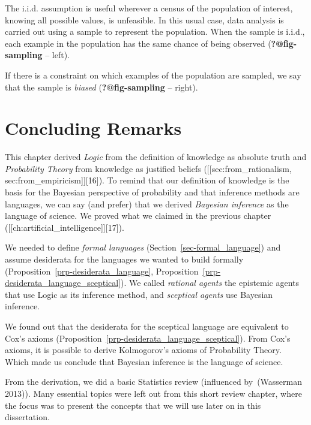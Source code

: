 \documentclass[
  letterpaper,
  12pt,
  british]{tufte-book}
\theoremstyle{plain}
\theoremstyle{plain}
\theoremstyle{definition}
\theoremstyle{remark}
\begin{document}
The i.i.d. assumption is useful wherever a census of the population of
interest, knowing all possible values, is unfeasible. In this usual
case, data analysis is carried out using a sample to represent the
population. When the sample is i.i.d., each example in the population
has the same chance of being observed (\textbf{?@fig-sampling} -- left).

If there is a constraint on which examples of the population are
sampled, we say that the sample is \emph{biased}
(\textbf{?@fig-sampling} -- right).

\hypertarget{concluding-remarks-1}{%
\section{Concluding Remarks}\label{concluding-remarks-1}}

This chapter derived \emph{Logic} from the definition of knowledge as
absolute truth and \emph{Probability Theory} from knowledge as justified
beliefs ({[}{[}sec:from\_rationalism,
sec:from\_empiricism{]}{]}{[}16{]}). To remind that our definition of
knowledge is the basis for the Bayesian perspective of probability and
that inference methods are languages, we can say (and prefer) that we
derived \emph{Bayesian inference} as the language of science. We proved
what we claimed in the previous chapter
({[}{[}ch:artificial\_intelligence{]}{]}{[}17{]}).

We needed to define \emph{formal languages}
(Section~\ref{sec-formal_language}) and assume desiderata for the
languages we wanted to build formally
(Proposition~\ref{prp-desiderata_language},
Proposition~\ref{prp-desiderata_language_sceptical}). We called
\emph{rational agents} the epistemic agents that use Logic as its
inference method, and \emph{sceptical agents} use Bayesian inference.

We found out that the desiderata for the sceptical language are
equivalent to Cox's axioms
(Proposition~\ref{prp-desiderata_language_sceptical}). From Cox's
axioms, it is possible to derive Kolmogorov's axioms of Probability
Theory. Which made us conclude that Bayesian inference is the language
of science.

From the derivation, we did a basic Statistics review (influenced
by~(Wasserman
2013)).
Many essential topics were left out from this short review chapter,
where the focus was to present the concepts that we will use later on in
this dissertation.
\end{document}
